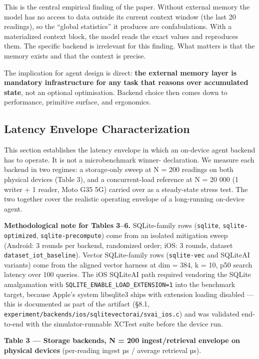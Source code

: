 This is the central empirical finding of the paper. Without external memory the
model has no access to data outside its current context window (the last 20
readings), so the ``global statistics'' it produces are confabulations. With a
materialized context block, the model reads the exact values and reproduces
them. The specific backend is irrelevant for this finding. What matters is that
the memory exists and that the context is precise.

The implication for agent design is direct: \textbf{the external memory layer is
mandatory infrastructure for any task that reasons over accumulated state}, not
an optional optimisation. Backend choice then comes down to performance,
primitive surface, and ergonomics.

\subsection{Latency Envelope
Characterization}\label{latency-envelope-characterization}

This section establishes the latency envelope in which an on-device agent
backend has to operate. It is not a microbenchmark winner- declaration. We
measure each backend in two regimes: a storage-only sweep at N = 200 readings on
both physical devices (Table 3), and a concurrent-load reference at N = 20 000
(1 writer + 1 reader, Moto G35 5G) carried over as a steady-state stress test.
The two together cover the realistic operating envelope of a long-running
on-device agent.

\textbf{Methodological note for Tables 3--6.} SQLite-family rows
(\texttt{sqlite}, \texttt{sqlite-optimized}, \texttt{sqlite-precompute}) come
from an isolated mitigation sweep (Android: 3 rounds per backend, randomized
order; iOS: 3 rounds, dataset \texttt{dataset\_iot\_baseline}). Vector
SQLite-family rows (\texttt{sqlite-vec} and SQLiteAI variants) come from the
aligned vector harness at dim = 384, k = 10, p50 search latency over 100
queries. The iOS SQLiteAI path required vendoring the SQLite amalgamation with
\texttt{SQLITE\_ENABLE\_LOAD\_EXTENSION=1} into the benchmark target, because
Apple's system libsqlite3 ships with extension loading disabled --- this is
documented as part of the artifact (§8.1,
\texttt{experiment/backends/ios/sqlitevectorai/svai\_ios.c}) and was validated
end-to-end with the simulator-runnable XCTest suite before the device run.

\textbf{Table 3 --- Storage backends, N = 200 ingest/retrieval envelope on
physical devices} (per-reading ingest µs / average retrieval µs).


